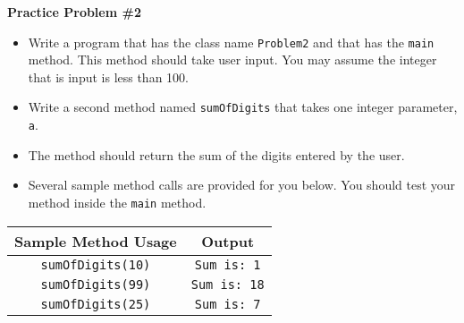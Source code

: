 \documentclass[12pt]{article}
\begin{document}
\vspace*{0.5cm}
\noindent\textbf{Practice Problem \#2}
\begin{itemize}
	\item Write a program that has the class name \texttt{Problem2} and that has the \texttt{main} method. This method should take user input. You may assume the integer that is input is less than 100.
	\item Write a second method named \texttt{sumOfDigits} that takes one integer parameter, \texttt{a}.
	\item The method should return the sum of the digits entered by the user.
	\item Several sample method calls are provided for you below. You should test your method inside the \texttt{main} method.
\end{itemize}
\begin{center}
\begin{tabular}{| c | c |}
\hline\rule{0pt}{4ex}
Sample Method Usage & Output \\
\hline\rule{0pt}{4ex}
\texttt{sumOfDigits(10)} & \texttt{Sum is: 1}\\
\hline\rule{0pt}{4ex}
\texttt{sumOfDigits(99)} & \texttt{Sum is: 18}\\
\hline\rule{0pt}{4ex}
\texttt{sumOfDigits(25)} & \texttt{Sum is: 7}\\
\hline
\end{tabular}
\end{center}
\end{document}
